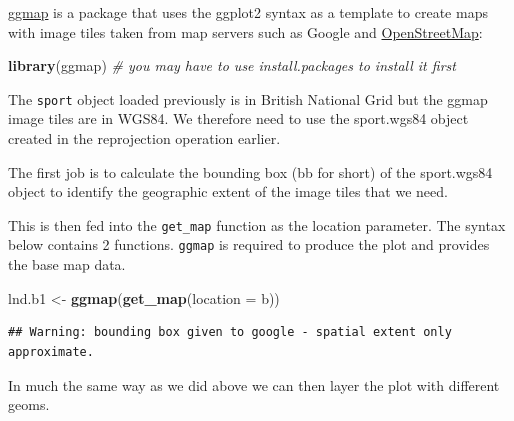 \documentclass[]{article}
\newenvironment{Shaded}{}{}
\newcommand{\KeywordTok}[1]{\textcolor[rgb]{0.00,0.44,0.13}{\textbf{{#1}}}}
\newcommand{\DataTypeTok}[1]{\textcolor[rgb]{0.56,0.13,0.00}{{#1}}}
\newcommand{\DecValTok}[1]{\textcolor[rgb]{0.25,0.63,0.44}{{#1}}}
\newcommand{\FloatTok}[1]{\textcolor[rgb]{0.25,0.63,0.44}{{#1}}}
\newcommand{\CommentTok}[1]{\textcolor[rgb]{0.38,0.63,0.69}{\textit{{#1}}}}
\newcommand{\NormalTok}[1]{{#1}}
\begin{document}
\href{http://journal.r-project.org/archive/2013-1/kahle-wickham.pdf}{ggmap}
is a package that uses the ggplot2 syntax as a template to create maps
with image tiles taken from map servers such as Google and
\href{http://www.openstreetmap.org/}{OpenStreetMap}:

\begin{Shaded}
\begin{Highlighting}[]
\KeywordTok{library}\NormalTok{(ggmap)  }\CommentTok{# you may have to use install.packages to install it first}
\end{Highlighting}
\end{Shaded}
The \texttt{sport} object loaded previously is in British National Grid
but the ggmap image tiles are in WGS84. We therefore need to use the
sport.wgs84 object created in the reprojection operation earlier.

The first job is to calculate the bounding box (bb for short) of the
sport.wgs84 object to identify the geographic extent of the image tiles
that we need.

\begin{Shaded}
\end{Shaded}
This is then fed into the \texttt{get\_map} function as the location
parameter. The syntax below contains 2 functions. \texttt{ggmap} is
required to produce the plot and provides the base map data.

\begin{Shaded}
\begin{Highlighting}[]
\NormalTok{lnd.b1 <- }\KeywordTok{ggmap}\NormalTok{(}\KeywordTok{get_map}\NormalTok{(}\DataTypeTok{location =} \NormalTok{b))}
\end{Highlighting}
\end{Shaded}
\begin{verbatim}
## Warning: bounding box given to google - spatial extent only approximate.
\end{verbatim}
In much the same way as we did above we can then layer the plot with
different geoms.
\end{document}
